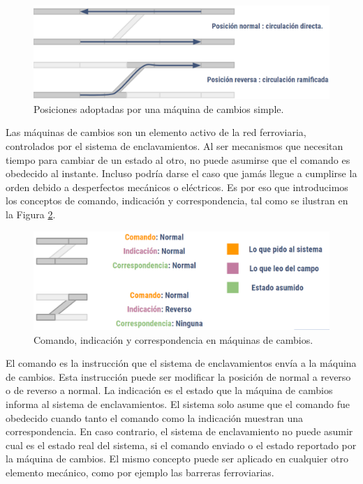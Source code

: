     \begin{figure}[H]
        \centering
        \includegraphics[width=1\textwidth]{Figuras/cambio_3.PNG}
        \centering\caption{Posiciones adoptadas por una máquina de cambios simple.}
        \label{fig:cambios_3}
    \end{figure}

    Las máquinas de cambios son un elemento activo de la red ferroviaria, controlados por el sistema de enclavamientos. Al ser mecanismos que necesitan tiempo para cambiar de un estado al otro, no puede asumirse que el comando es obedecido al instante. Incluso podría darse el caso que jamás llegue a cumplirse la orden debido a desperfectos mecánicos o eléctricos. Es por eso que introducimos los conceptos de comando, indicación y correspondencia, tal como se ilustran en la Figura \ref{fig:cambios_4}.

    \begin{figure}[H]
        \centering
        \includegraphics[width=1\textwidth]{Figuras/cambios}
        \centering\caption{Comando, indicación y correspondencia en máquinas de cambios.}
        \label{fig:cambios_4}
    \end{figure}
    
    El comando es la instrucción que el sistema de enclavamientos envía a la máquina de cambios. Esta instrucción puede ser modificar la posición de normal a reverso o de reverso a normal. La indicación es el estado que la máquina de cambios informa al sistema de enclavamientos. El sistema solo asume que el comando fue obedecido cuando tanto el comando como la indicación muestran una correspondencia. En caso contrario, el sistema de enclavamiento no puede asumir cual es el estado real del sistema, si el comando enviado o el estado reportado por la máquina de cambios. El mismo concepto puede ser aplicado en cualquier otro elemento mecánico, como por ejemplo las barreras ferroviarias.

